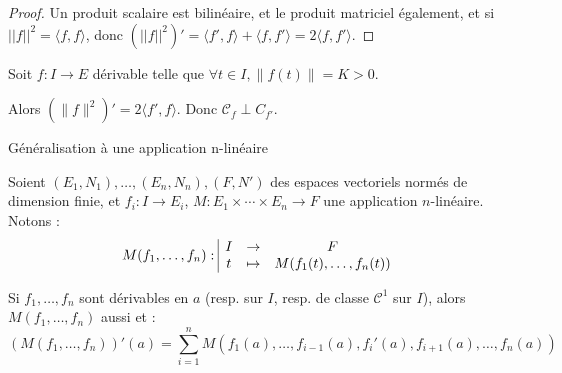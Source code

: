 
\begin{proof}
    Un produit scalaire est bilinéaire, et le produit matriciel également, et si 
    $||f||^2 = \langle f, f \rangle$, donc $(||f||^2)' = \langle f', f \rangle + \langle f, f' \rangle = 2 \langle f, f' \rangle$.
\end{proof}

\begin{exemple}
Soit $f: I \to E$ dérivable telle que $\forall t \in I, \|f(t)\| = K > 0$.

Alors $(\|f\|^2)' = 2 \langle f',f \rangle$. Donc $\mathscr C_f \perp C_{f'}$.
\end{exemple}

\begin{figure}[htbp]
\centering
{}
\end{figure}

\begin{theoreme}{Généralisation à une application n-linéaire}{}

    Soient $(E_1, N_1), \ldots, (E_n, N_n), (F, N')$ des espaces vectoriels normés de dimension finie, et
    $f_i : I \to E_i$, $M : E_1 \times \cdots \times E_n \to F$ une application $n$-linéaire.
    Notons :
    \[M(f_1, \ldots, f_n): \space \begin{array}{|ccc} \displaystyle I & \to & \displaystyle F \\ \displaystyle t & \mapsto & \displaystyle M(f_1(t), \ldots, f_n(t)) \end{array}\]

    \avspace Si $f_1, \ldots, f_n$ sont dérivables en $a$ (resp. sur $I$, resp. de classe $\mathscr C^1$ sur $I$),
    alors $M(f_1, \ldots, f_n)$ aussi et :
    \[(M(f_1, \ldots, f_n))'(a) = \sum_{i=1}^n M(f_1(a), \ldots, f_{i-1}(a), f_i'(a), f_{i+1}(a), \ldots, f_n(a))\]
\end{theoreme}

